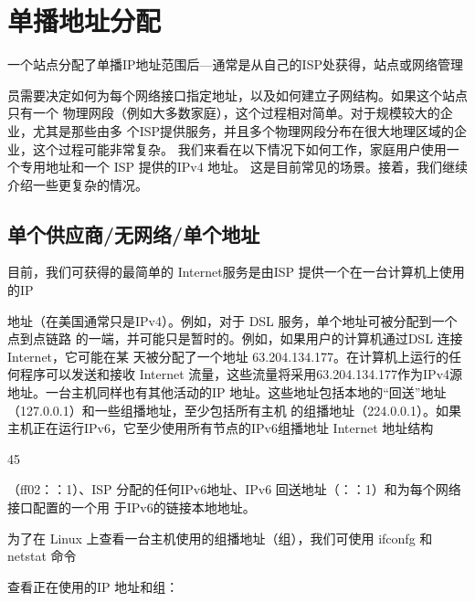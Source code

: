 \section{单播地址分配}
一个站点分配了单播IP地址范围后—通常是从自己的ISP处获得，站点或网络管理

员需要决定如何为每个网络接口指定地址，以及如何建立子网结构。如果这个站点只有一个
物理网段（例如大多数家庭），这个过程相对简单。对于规模较大的企业，尤其是那些由多
个ISP提供服务，并且多个物理网段分布在很大地理区域的企业，这个过程可能非常复杂。
我们来看在以下情况下如何工作，家庭用户使用一个专用地址和一个 ISP 提供的IPv4 地址。
这是目前常见的场景。接着，我们继续介绍一些更复杂的情况。

\subsection{单个供应商/无网络/单个地址}
目前，我们可获得的最简单的 Internet服务是由ISP 提供一个在一台计算机上使用的IP

地址（在美国通常只是IPv4）。例如，对于 DSL 服务，单个地址可被分配到一个点到点链路
的一端，并可能只是暂时的。例如，如果用户的计算机通过DSL 连接 Internet，它可能在某
天被分配了一个地址 63.204.134.177。在计算机上运行的任何程序可以发送和接收 Internet
流量，这些流量将采用63.204.134.177作为IPv4源地址。一台主机同样也有其他活动的IP
地址。这些地址包括本地的“回送”地址（127.0.0.1）和一些组播地址，至少包括所有主机
的组播地址（224.0.0.1）。如果主机正在运行IPv6，它至少使用所有节点的IPv6组播地址
Internet 地址结构

45

（ff02：：1）、ISP 分配的任何IPv6地址、IPv6 回送地址（：：1）和为每个网络接口配置的一个用
于IPv6的链接本地地址。

为了在 Linux 上查看一台主机使用的组播地址（组），我们可使用 ifconfg 和 netstat 命令

查看正在使用的IP 地址和组：

